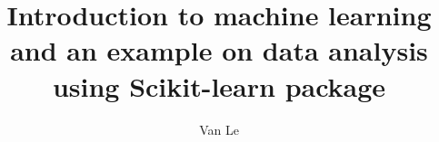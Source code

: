 \documentclass[12pt]{beamer}
\author[nle12@vols.utk.edu]{Van Le }
\institute[UTK] %
{
		Department of Mathematics\\
	The University of Tennessee, Knoxville\\

}
\theoremstyle{definition}
\theoremstyle{remark}
\numberwithin{equation}{section}
\begin{document}
	\title[Introduction to machine learning]{Introduction to machine learning and an example on data analysis using Scikit-learn package}
	\frame{\titlepage}
	\frame
	{
			\tableofcontents
	}

\frame{\frametitle{}}
\end{document}
